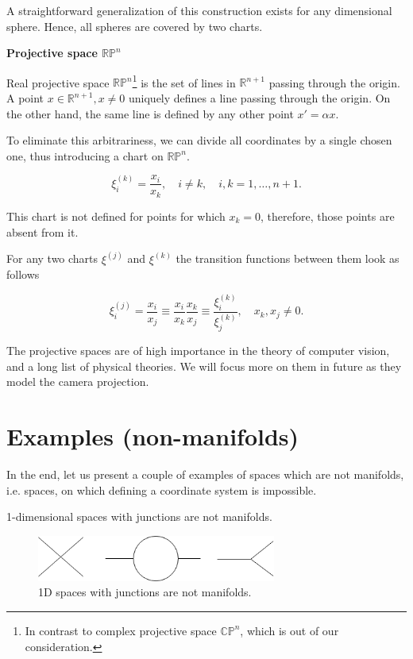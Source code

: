 \documentclass[a4paper,10pt]{article}
\begin{document}
A straightforward generalization of this construction exists for any dimensional sphere. Hence, all spheres are covered by two charts.
\newline

{\bf Projective space $\mathbb{RP}^n$}
\newline

Real projective space $\mathbb{RP}^n$\footnote{ In contrast to complex projective space $\mathbb{CP}^n$, which is out of our consideration.  } is the set of lines in $\mathbb{R}^{n+1}$ passing through the origin. A point $x \in \mathbb{R}^{n+1}, x\neq 0$ uniquely defines a line passing through the origin. On the other hand, the same line is defined by any other point $x' = \alpha x$. 

To eliminate this arbitrariness, we can divide all coordinates by a single chosen one, thus introducing a chart on $\mathbb{RP}^n$.

\begin{equation}
\xi^{(k)}_i = \frac{x_i}{x_k},  \quad i\neq k, \quad i,k = 1, \ldots, n+1.
\end{equation}

This chart is not defined for points for which $x_k = 0$, therefore, those points are absent from it. 

For any two charts $\xi^{(j)}$ and $\xi^{(k)}$ the transition functions between them look as follows

\begin{equation}
 \xi^{(j)}_i = \frac{x_i}{x_j} \equiv \frac{x_i}{x_k}\frac{x_k}{x_j} \equiv \frac{\xi^{(k)}_i}{\xi^{(k)}_j}, \quad x_k, x_j\neq 0.
\end{equation}

The projective spaces are of high importance in the theory of computer vision, and a long list of physical theories. We will focus more on them in future as they model the camera projection. 


\newpage
\section{Examples (non-manifolds)}

In the end, let us present a couple of examples of spaces which are not manifolds, i.e. spaces, on which defining a coordinate system is impossible.

1-dimensional spaces with junctions are not manifolds.

\begin{figure}[h]
\centering
 \includegraphics[width=0.7\textwidth]{../../images/NonManifolds.png}
 \caption{ 1D spaces with junctions are not manifolds.}
 \label{fig:nm}
\end{figure}
\end{document}
